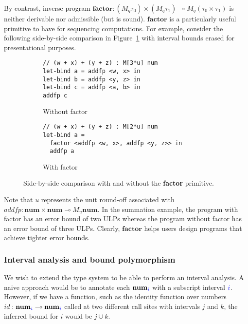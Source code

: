By contrast, inverse program $\textbf{factor}: (M_q \tau_0) \times (M_q \tau_1)
\multimap M_q (\tau_0 \times \tau_1)$ is neither derivable nor admissible (but
is sound). $\textbf{factor}$ is a particularly useful primitive to have for
sequencing computations. For example, consider the following side-by-side
comparison in Figure~\ref{fig:factor-side-by-side} with interval bounds erased
for presentational purposes.

\begin{figure}[ht]
\centering

\begin{subfigure}[t]{0.48\textwidth}
\begin{lstlisting}
// (w + x) + (y + z) : M[3*u] num 
let-bind a = addfp <w, x> in
let-bind b = addfp <y, z> in
let-bind c = addfp <a, b> in
addfp c 
\end{lstlisting}
\caption{Without factor}
\end{subfigure}
\hfill
\begin{subfigure}[t]{0.48\textwidth}
\begin{lstlisting}
// (w + x) + (y + z) : M[2*u] num 
let-bind a = 
  factor <addfp <w, x>, addfp <y, z>> in
  addfp a
\end{lstlisting}
\caption{With factor}
\end{subfigure}

\caption{Side-by-side comparison with and without the \textbf{factor} primitive.}
\label{fig:factor-side-by-side}
\end{figure}
Note that $u$ represents the unit round-off associated with $addfp :
\textbf{num} \times \textbf{num} \multimap M_u \textbf{num}$. In the summation
example, the program with factor has an error bound of two ULPs whereas the
program without factor has an error bound of three ULPs. Clearly,
$\textbf{factor}$ helps users design programs that achieve tighter error bounds.

\subsubsection*{Interval analysis and bound polymorphism} \label{sec:interval}
We wish to extend the type system to be able to perform an interval analysis. A
naive approach would be to annotate each $\textbf{num}_{\textcolor{blue}{i}}$ with a
subscript interval $\textcolor{blue}{i}$. However, if we have a function, such as the
identity function over numbers $id : \textbf{num}_{\textcolor{blue}{i}} \multimap
\textbf{num}_{\textcolor{blue}{i}}$ called at two different call sites with intervals $j$
and $k$, the inferred bound for $i$ would be $j \cup k$.

